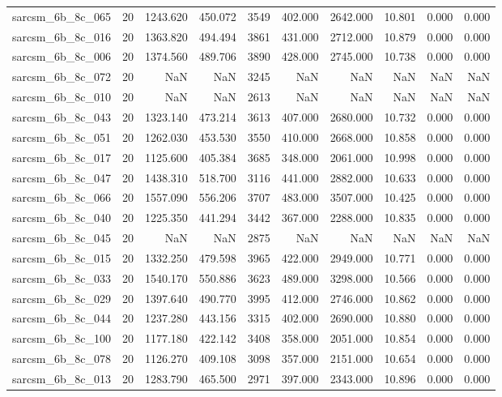 \begin{tabular}{lrrrrrrrrr}
sarcsm\_6b\_8c\_065 & 20 & 1243.620 & 450.072 & 3549 & 402.000 & 2642.000 & 10.801 & 0.000 & 0.000 \\
sarcsm\_6b\_8c\_016 & 20 & 1363.820 & 494.494 & 3861 & 431.000 & 2712.000 & 10.879 & 0.000 & 0.000 \\
sarcsm\_6b\_8c\_006 & 20 & 1374.560 & 489.706 & 3890 & 428.000 & 2745.000 & 10.738 & 0.000 & 0.000 \\
sarcsm\_6b\_8c\_072 & 20 & NaN & NaN & 3245 & NaN & NaN & NaN & NaN & NaN \\
sarcsm\_6b\_8c\_010 & 20 & NaN & NaN & 2613 & NaN & NaN & NaN & NaN & NaN \\
sarcsm\_6b\_8c\_043 & 20 & 1323.140 & 473.214 & 3613 & 407.000 & 2680.000 & 10.732 & 0.000 & 0.000 \\
sarcsm\_6b\_8c\_051 & 20 & 1262.030 & 453.530 & 3550 & 410.000 & 2668.000 & 10.858 & 0.000 & 0.000 \\
sarcsm\_6b\_8c\_017 & 20 & 1125.600 & 405.384 & 3685 & 348.000 & 2061.000 & 10.998 & 0.000 & 0.000 \\
sarcsm\_6b\_8c\_047 & 20 & 1438.310 & 518.700 & 3116 & 441.000 & 2882.000 & 10.633 & 0.000 & 0.000 \\
sarcsm\_6b\_8c\_066 & 20 & 1557.090 & 556.206 & 3707 & 483.000 & 3507.000 & 10.425 & 0.000 & 0.000 \\
sarcsm\_6b\_8c\_040 & 20 & 1225.350 & 441.294 & 3442 & 367.000 & 2288.000 & 10.835 & 0.000 & 0.000 \\
sarcsm\_6b\_8c\_045 & 20 & NaN & NaN & 2875 & NaN & NaN & NaN & NaN & NaN \\
sarcsm\_6b\_8c\_015 & 20 & 1332.250 & 479.598 & 3965 & 422.000 & 2949.000 & 10.771 & 0.000 & 0.000 \\
sarcsm\_6b\_8c\_033 & 20 & 1540.170 & 550.886 & 3623 & 489.000 & 3298.000 & 10.566 & 0.000 & 0.000 \\
sarcsm\_6b\_8c\_029 & 20 & 1397.640 & 490.770 & 3995 & 412.000 & 2746.000 & 10.862 & 0.000 & 0.000 \\
sarcsm\_6b\_8c\_044 & 20 & 1237.280 & 443.156 & 3315 & 402.000 & 2690.000 & 10.880 & 0.000 & 0.000 \\
sarcsm\_6b\_8c\_100 & 20 & 1177.180 & 422.142 & 3408 & 358.000 & 2051.000 & 10.854 & 0.000 & 0.000 \\
sarcsm\_6b\_8c\_078 & 20 & 1126.270 & 409.108 & 3098 & 357.000 & 2151.000 & 10.654 & 0.000 & 0.000 \\
sarcsm\_6b\_8c\_013 & 20 & 1283.790 & 465.500 & 2971 & 397.000 & 2343.000 & 10.896 & 0.000 & 0.000 \\

\end{tabular}
